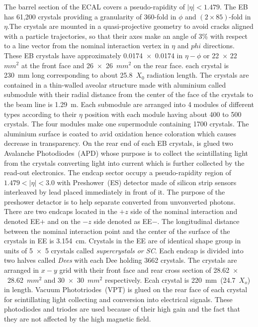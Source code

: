 The barrel section of the ECAL covers a pseudo-rapidity of $\vert \eta \vert< 1.479 $. The EB has 61,200 crystals providing a granularity of 360-fold in $\phi$ and $(2 \times 85)$-fold in $\eta$.The crystals are mounted in a quasi-projective geometry to avoid cracks aligned with a particle trajectories, so that their axes make an angle of 3\% with respect to a line vector from the nominal interaction vertex in $\eta$ and $phi$ directions. These EB crystals have approximately 0.0174~$\times$~0.0174  in $\eta-\phi$ or 22~$\times$ 22~$mm^{2}$ at the front face and 26~$\times$~26~$mm^{2}$ on the rear face. each crystal is 230~mm long corresponding to about 25.8~$X_{0}$ radiation length. The crystals are contained in a thin-walled aveolar structure made with aluminium called submodule with their radial distance from the center of the face of the crystals to the beam line is 1.29~m. Each submodule are arranged into 4 modules of different types according to their $\eta$ position with each module having about 400 to 500 crystals.  The four modules make one supermodule containing 1700 crystals. The aluminium surface is coated to avid oxidation hence coloration which causes decrease in transparency.  On the rear end of each EB crystals, is glued two Avalanche Photodiodes~(APD) whose purpose is to collect the scintillating light from the crystals converting light into current which is further collected by the read-out electronics.
 \newline
The endcap sector occupy a pseudo-rapidity region of 
$1.479 <\vert \eta \vert < 3.0$ with Preshower~(\textsc{ES}) detector made of silicon strip sensors interleaved by lead placed immediately in front of it.  The purpose of the preshower detactor is to help separate converted from unvonverted photons. There are two endcaps located in the $+z$ side of the nominal interaction and denoted \textsc{EE}$+$ and on the $-z$ side denoted as \textsc{EE}$-$. The longitudinal distance between the nominal interaction point and the center of the surface of the crystals in \textsc{EE} is 3.154~cm. Crystals in the \textsc{EE} are of identical shape group in  units of 5~$\times$~5 crystals called \textit{supercrystals or SC}. Each endcap is divided into two halves called \textit{Dees} with each Dee holding 3662 crystals. The crystals are arranged in $x-y$ grid with their front face and rear cross section of 28.62~$\times$~28.62~$mm^{2}$ and 30~$\times$~30~$mm^{2}$ respectively. Ecah crystal is 220~mm~(24.7~$X_{o}$) in length. Vacuum Phototriodes~(VPT) is glued on the rear face of each crystal for scintillating light collecting and conversion into electrical signals. These photodiodes and triodes are used because of their high gain and the fact that they are not affected by the high magnetic field. 
